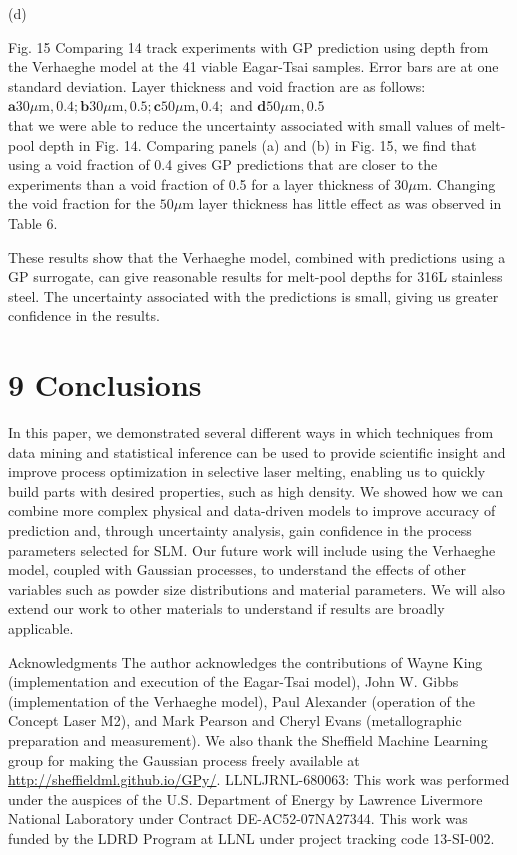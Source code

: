 \documentclass[10pt]{article}
\begin{document}
(d)

Fig. 15 Comparing 14 track experiments with GP prediction using depth from the Verhaeghe model at the 41 viable Eagar-Tsai samples. Error bars are at one standard deviation. Layer thickness and void fraction are as follows: $\mathbf{a} 30 \mu \mathrm{m}, 0.4 ; \mathbf{b} 30 \mu \mathrm{m}, 0.5 ; \mathbf{c} 50 \mu \mathrm{m}, 0.4 ;$ and $\mathbf{d} 50 \mu \mathrm{m}, 0.5$\\
that we were able to reduce the uncertainty associated with small values of melt-pool depth in Fig. 14. Comparing panels (a) and (b) in Fig. 15, we find that using a void fraction of 0.4 gives GP predictions that are closer to the experiments than a void fraction of 0.5 for a layer thickness of $30 \mu \mathrm{m}$. Changing the void fraction for the $50 \mu \mathrm{m}$ layer thickness has little effect as was observed in Table 6.

These results show that the Verhaeghe model, combined with predictions using a GP surrogate, can give reasonable results for melt-pool depths for 316L stainless steel. The uncertainty associated with the predictions is small, giving us greater confidence in the results.

\section*{9 Conclusions}
In this paper, we demonstrated several different ways in which techniques from data mining and statistical inference can be used to provide scientific insight and improve process optimization in selective laser melting, enabling us to quickly build parts with desired properties, such as high density. We showed how we can combine more complex physical and data-driven models to improve accuracy of prediction and, through uncertainty analysis, gain confidence in the process parameters selected for SLM. Our future work will include using the Verhaeghe model, coupled with Gaussian processes, to understand the effects of other variables such as powder size distributions and material parameters. We will also extend our work to other materials to understand if results are broadly applicable.

Acknowledgments The author acknowledges the contributions of Wayne King (implementation and execution of the Eagar-Tsai model), John W. Gibbs (implementation of the Verhaeghe model), Paul Alexander (operation of the Concept Laser M2), and Mark Pearson and Cheryl Evans (metallographic preparation and measurement). We also thank the Sheffield Machine Learning group for making the Gaussian process freely available at \href{http://sheffieldml.github.io/GPy/}{http://sheffieldml.github.io/GPy/}. LLNLJRNL-680063: This work was performed under the auspices of the U.S. Department of Energy by Lawrence Livermore National Laboratory under Contract DE-AC52-07NA27344. This work was funded by the LDRD Program at LLNL under project tracking code 13-SI-002.
\end{document}
